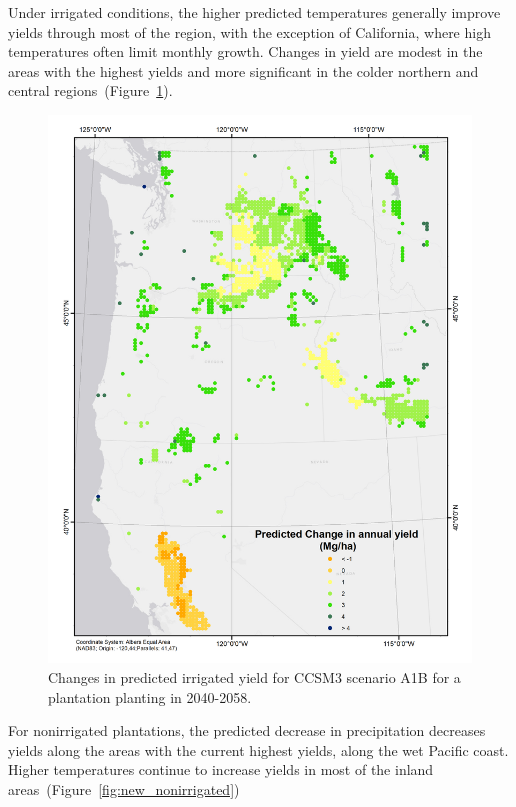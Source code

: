\documentclass[preprint,12pt]{elsarticle}
\begin{document}
Under irrigated conditions, the higher predicted temperatures
generally improve yields through most of the region, with the
exception of California, where high temperatures often limit monthly
growth.  Changes in yield are modest in the areas with the highest
yields and more significant in the colder northern and central
regions~(Figure~\ref{fig:new_irrigated}).
 
\begin{figure}[hp]
  \centering
  \includegraphics[width=1\linewidth]{climate_irrigated}
  \caption{Changes in predicted irrigated yield for \ac{CCSM3} scenario A1B
    for a plantation planting in 2040-2058.}
  \label{fig:new_irrigated}
\end{figure}

For nonirrigated plantations, the predicted decrease in precipitation
decreases yields along the areas with the current highest yields,
along the wet Pacific coast.  Higher temperatures continue to increase
yields in most of the inland areas~(Figure~\ref{fig:new_nonirrigated})
\end{document}
